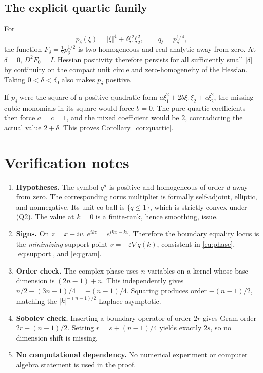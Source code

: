 \documentclass[11pt]{article}
\theoremstyle{remark}
\newcommand{\eps}{\varepsilon}
\begin{document}
\subsection{The explicit quartic family}

For
\[
p_\delta(\xi)=|\xi|^4+\delta\xi_1^2\xi_2^2,
\qquad q_\delta=p_\delta^{1/4},
\]
the function
$F_\delta=\tfrac12p_\delta^{1/2}$ is two-homogeneous and real analytic away
from zero.  At $\delta=0$, $D^2F_0=I$.  Hessian positivity therefore persists
for all sufficiently small $|\delta|$ by continuity on the compact unit
circle and zero-homogeneity of the Hessian.  Taking $0<\delta<\delta_0$ also
makes $p_\delta$ positive.

If $p_\delta$ were the square of a positive quadratic form
$a\xi_1^2+2b\xi_1\xi_2+c\xi_2^2$, the missing cubic monomials in its square
would force $b=0$.  The pure quartic coefficients then force $a=c=1$, and the
mixed coefficient would be $2$, contradicting the actual value $2+\delta$.
This proves Corollary~\ref{cor:quartic}.

\section{Verification notes}

\begin{enumerate}
\item \textbf{Hypotheses.}  The symbol $q^d$ is positive and homogeneous of
order $d$ away from zero.  The corresponding torus multiplier is formally
self-adjoint, elliptic, and nonnegative.  Its unit co-ball is $\{q\le1\}$,
which is strictly convex under (Q2).  The value at $k=0$ is a finite-rank,
hence smoothing, issue.
\item \textbf{Signs.}  On $z=x+iv$, $e^{ikz}=e^{ikx-kv}$.  Therefore the
boundary equality locus is the \emph{minimizing} support point
$v=-\eps\nabla q(k)$, consistent in \eqref{eq:phase}, \eqref{eq:support}, and
\eqref{eq:gram}.
\item \textbf{Order check.}  The complex phase uses $n$ variables on a kernel
whose base dimension is $(2n-1)+n$.  This independently gives
$n/2-(3n-1)/4=-(n-1)/4$.  Squaring produces order $-(n-1)/2$, matching the
$|k|^{-(n-1)/2}$ Laplace asymptotic.
\item \textbf{Sobolev check.}  Inserting a boundary operator of order $2r$
gives Gram order $2r-(n-1)/2$.  Setting $r=s+(n-1)/4$ yields exactly $2s$,
so no dimension shift is missing.
\item \textbf{No computational dependency.}  No numerical experiment or
computer algebra statement is used in the proof.
\end{enumerate}
\end{document}
